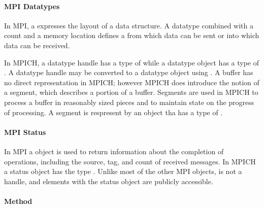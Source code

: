 
\paragraph{MPI Datatypes}

In MPI, a  expresses the layout of a data structure.  A datatype
combined with a count and a memory location defines a  from which
data can be sent or into which data can be received.

In MPICH, a datatype handle has a type of  while a datatype
object has a type of .  A datatype handle may be converted
to a datatype object using .  A buffer has no
direct representation in MPICH; however MPICH does introduce the notion of a
segment, which describes a portion of a buffer.  Segments are used in MPICH to
process a buffer in reasonably sized pieces and to maintain state on the
progress of processing.  A segment is respresent by an object tha has a type
of .


\paragraph{MPI Status}

In MPI a  object is used to return information about the
completion of operations, including the source, tag, and count of received
messages.  In MPICH a status object has the type .  Unlike
most of the other MPI objects,  is not a handle, and elements
with the status object are publicly accessible.


\paragraph{Method}


